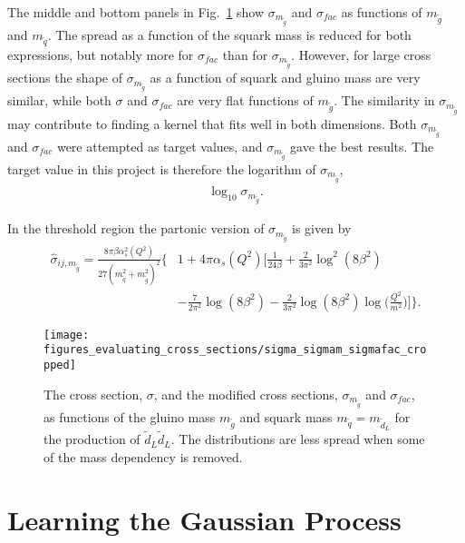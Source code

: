 \documentclass[twoside,english]{uiofysmaster}
\begin{document}
{The middle and bottom panels in Fig.~\ref{Fig:: evaluating cross : Comparison sigma and sigma/m} show $\sigma_{m_{\widetilde{g}}}$ and $\sigma_{fac}$ as functions of $m_{\widetilde{g}}$ and $m_{\widetilde{q}}$. The spread as a function of the squark mass is reduced for both expressions, but notably more for $\sigma_{fac}$ than for $\sigma_{m_{\widetilde{g}}}$. However, for large cross sections the shape of $\sigma_{m_{\widetilde{g}}}$ as a function of squark and gluino mass are very similar, while both $\sigma$ and $\sigma_{fac}$ are very flat functions of $m_{\widetilde{g}}$. The similarity in $\sigma_{m_{\widetilde{g}}}$ may contribute to finding a kernel that fits well in both dimensions. Both $\sigma_{m_{\widetilde{g}}}$ and $\sigma_{fac}$ were attempted as target values, and $\sigma_{m_{\widetilde{g}}}$ gave the best results. The target value in this project is therefore the logarithm of $\sigma_{m_{\widetilde{g}}}$,
\begin{align}
\log_{10} \sigma_{m_{\widetilde{g}}}.
\end{align}

In the threshold region the partonic version of $\sigma_{m_{\widetilde{g}}}$ is given by
\begin{align}
\hat{\sigma}_{ij, m_{\widetilde{g}}} =  \frac{8 \pi \beta \alpha^2_s (Q^2)}{27(m_{\widetilde{q}}^2 + m_{\widetilde{g}}^2)^2} \Bigg\{&1 
 + 4 \pi \alpha_s (Q^2) \Bigg[ \frac{1}{24 \beta} 
 + \frac{2}{3 \pi^2} \log^2(8 \beta^2) \nonumber \\& - \frac{7}{2 \pi^2} \log (8 \beta^2)
- \frac{2}{3 \pi^2} \log (8 \beta^2) \log \Big( \frac{Q^2}{m^2} \Big) \Bigg] \Bigg\}.
\end{align}



\begin{figure}
\texttt{[image: figures\_evaluating\_cross\_sections/sigma\_sigmam\_sigmafac\_cropped]}
\caption{The cross section, $\sigma$, and the modified cross sections, $\sigma_{m_{\widetilde{g}}}$ and $\sigma_{fac}$,  as functions of the gluino mass $m_{\widetilde{g}}$ and squark mass $m_{\widetilde{q}} = m_{\widetilde{d}_L}$ for the production of $\widetilde{d}_L \widetilde{d}_L$. The distributions are less spread when some of the mass dependency is removed.}
\label{Fig:: evaluating cross : Comparison sigma and sigma/m}
\end{figure}

\section{Learning the Gaussian Process}

}
\end{document}
